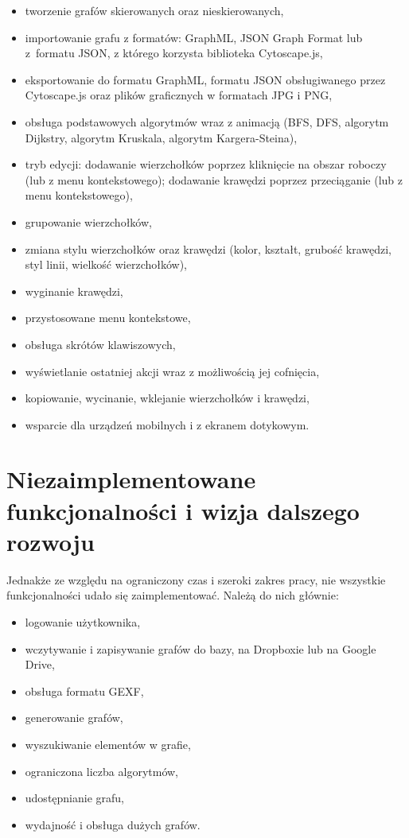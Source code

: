 \begin{itemize}
\setlength\itemsep{0em}
\item tworzenie grafów skierowanych oraz nieskierowanych,
\item importowanie grafu z formatów: GraphML, JSON Graph Format lub z~formatu JSON, z którego korzysta biblioteka Cytoscape.js,
\item eksportowanie do formatu GraphML, formatu JSON obsługiwanego przez Cytoscape.js oraz plików graficznych w formatach JPG i PNG,
\item obsługa podstawowych algorytmów wraz z animacją (BFS, DFS, algorytm Dijkstry, algorytm Kruskala, algorytm Kargera-Steina),
\item tryb edycji: dodawanie wierzchołków poprzez kliknięcie na obszar roboczy (lub z menu kontekstowego); dodawanie krawędzi poprzez przeciąganie (lub z menu kontekstowego),
\item grupowanie wierzchołków,
\item zmiana stylu wierzchołków oraz krawędzi (kolor, kształt, grubość krawędzi, styl linii, wielkość wierzchołków),
\item wyginanie krawędzi,
\item przystosowane menu kontekstowe,
\item obsługa skrótów klawiszowych,
\item wyświetlanie ostatniej akcji wraz z możliwością jej cofnięcia,
\item kopiowanie, wycinanie, wklejanie wierzchołków i krawędzi,
\item wsparcie dla urządzeń mobilnych i z ekranem dotykowym.
\end{itemize}

\section{Niezaimplementowane funkcjonalności i wizja dalszego rozwoju}

Jednakże ze względu na ograniczony czas i szeroki zakres pracy, nie wszystkie funkcjonalności udało się zaimplementować. Należą do nich głównie:

\begin{itemize}
\setlength\itemsep{0em}
\item logowanie użytkownika,
\item wczytywanie i zapisywanie grafów do bazy, na Dropboxie lub na Google Drive,
\item obsługa formatu GEXF,
\item generowanie grafów,
\item wyszukiwanie elementów w grafie,
\item ograniczona liczba algorytmów,
\item udostępnianie grafu,
\item wydajność i obsługa dużych grafów.
\end{itemize}

